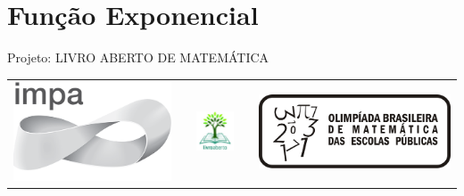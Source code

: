 \ifnum{}
\renewcommand\chapterillustration{./abertura-exponencial}
\else
\renewcommand\chapterillustration{./abertura-exponencial-professor}
\fi
\renewcommand\chapterwhat{Crescimento e decaimento exponenciais, função exponencial, juros compostos, progressão geométrica, expoentes racionais e irracionais.}
\renewcommand\chapterbecause{Dizemos que estamos diante de um crescimento exponencial sempre que o aumento percentual de determinada quantidade por unidade de tempo é constante. Este é o caso das medições econômicas, financeiras e políticas de crescimento - de vendas, lucros, preços de ações, produto interno bruto, inflação, taxas de juros. Assim, compreender bem o crescimento exponencial é crucial para compreender o mundo.}
\chapter{Função Exponencial}



\mbox{}\thispagestyle{empty}\clearpage

\thispagestyle{empty}

\begin{center}
Projeto: LIVRO ABERTO DE MATEMÁTICA

 \begin{tabular}{lcccr}
\includegraphics[scale=.15]{impa}& \quad\quad& \includegraphics[width=3cm]{logo} & \quad\quad& \includegraphics[scale=.24]{obmep} 
\end{tabular}
\end{center}

